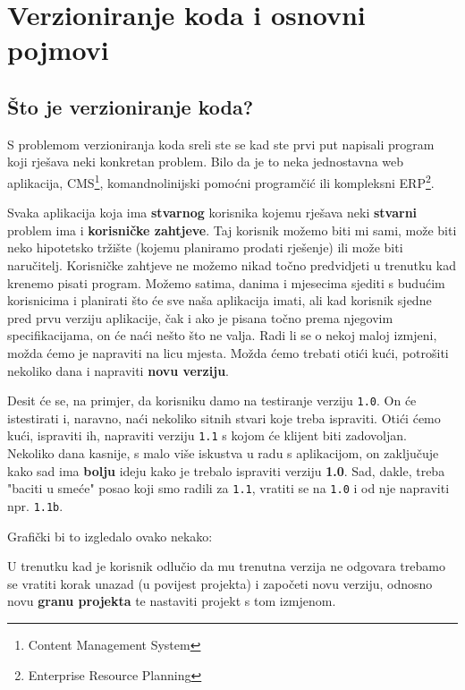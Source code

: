 \chapter*{Verzioniranje koda i osnovni pojmovi}

\section*{Što je verzioniranje koda?}

S problemom verzioniranja koda sreli ste se kad ste prvi put napisali program koji rješava neki konkretan problem. 
Bilo da je to neka jednostavna web aplikacija, CMS\footnote{Content Management System}, komandnolinijski pomoćni programčić ili kompleksni ERP\footnote{Enterprise Resource Planning}.

Svaka aplikacija koja ima \textbf{stvarnog} korisnika kojemu rješava neki \textbf{stvarni} problem ima i \textbf{korisničke zahtjeve}.
Taj korisnik možemo biti mi sami, može biti neko hipotetsko tržište (kojemu planiramo prodati rješenje) ili može biti naručitelj.
Korisničke zahtjeve ne možemo nikad točno predvidjeti u trenutku kad krenemo pisati program.
Možemo satima, danima i mjesecima sjediti s budućim korisnicima i planirati što će sve naša aplikacija imati, ali kad korisnik sjedne pred prvu verziju aplikacije, čak i ako je pisana točno prema njegovim specifikacijama, on će naći nešto što ne valja. 
Radi li se o nekoj maloj izmjeni, možda ćemo je napraviti na licu mjesta.
Možda ćemo trebati otići kući, potrošiti nekoliko dana i napraviti \textbf{novu verziju}.

Desit će se, na primjer, da korisniku damo na testiranje verziju \texttt{1.0}.
On će istestirati i, naravno, naći nekoliko sitnih stvari koje treba ispraviti.
Otići ćemo kući, ispraviti ih, napraviti verziju \texttt{1.1} s kojom će klijent biti zadovoljan.
Nekoliko dana kasnije, s malo više iskustva u radu s aplikacijom, on zaključuje kako sad ima \textbf{bolju} ideju kako je trebalo ispraviti verziju \textbf{1.0}.
Sad, dakle, treba "baciti u smeće" posao koji smo radili za \texttt{1.1}, vratiti se na \texttt{1.0} i od nje napraviti npr. \texttt{1.1b}.

Grafički bi to izgledalo ovako nekako:



U trenutku kad je korisnik odlučio da mu trenutna verzija ne odgovara trebamo se vratiti korak unazad (u povijest projekta) i započeti novu verziju, odnosno novu \textbf{granu projekta} te nastaviti projekt s tom izmjenom.

